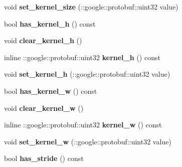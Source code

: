 \begin{DoxyCompactItemize}
void {\bfseries set\+\_\+kernel\+\_\+size} (\+::google\+::protobuf\+::uint32 value)
\item 
\mbox{\label{classcaffe_1_1_pooling_parameter_a3126010b7abec5174048f6ee3840071d}} 
bool {\bfseries has\+\_\+kernel\+\_\+h} () const
\item 
\mbox{\label{classcaffe_1_1_pooling_parameter_a044ce0120434a09f2ceab60de80230b1}} 
void {\bfseries clear\+\_\+kernel\+\_\+h} ()
\item 
\mbox{\label{classcaffe_1_1_pooling_parameter_ab451aa373468a17b6bf9956135485489}} 
inline \+::google\+::protobuf\+::uint32 {\bfseries kernel\+\_\+h} () const
\item 
\mbox{\label{classcaffe_1_1_pooling_parameter_ad3deaf7ea415cf8184ad233d93138c49}} 
void {\bfseries set\+\_\+kernel\+\_\+h} (\+::google\+::protobuf\+::uint32 value)
\item 
\mbox{\label{classcaffe_1_1_pooling_parameter_ac169f3fe257ae463facb630e65a127e2}} 
bool {\bfseries has\+\_\+kernel\+\_\+w} () const
\item 
\mbox{\label{classcaffe_1_1_pooling_parameter_a8fc044de2abf17f7dc43cd9f1453fd1b}} 
void {\bfseries clear\+\_\+kernel\+\_\+w} ()
\item 
\mbox{\label{classcaffe_1_1_pooling_parameter_acacbd1e2bdbe536db7e4dc41f38d0d30}} 
inline \+::google\+::protobuf\+::uint32 {\bfseries kernel\+\_\+w} () const
\item 
\mbox{\label{classcaffe_1_1_pooling_parameter_a419df15efb63bf411bb51977aad5b5a3}} 
void {\bfseries set\+\_\+kernel\+\_\+w} (\+::google\+::protobuf\+::uint32 value)
\item 
\mbox{\label{classcaffe_1_1_pooling_parameter_afe114d4d002f4245feb698a3bd9b85c6}} 
bool {\bfseries has\+\_\+stride} () const
\item 
\mbox{\label{classcaffe_1_1_pooling_parameter_a9b55af9575406cedcf1a299eee932fbf}} 

\end{DoxyCompactItemize}
